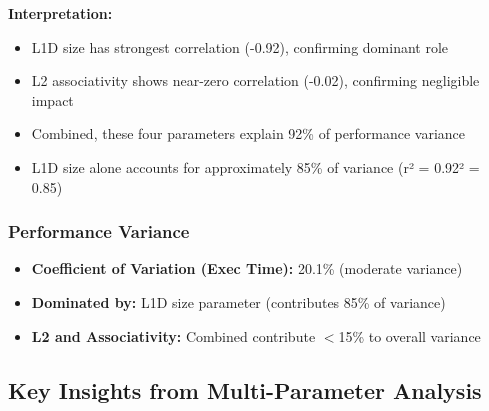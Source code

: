 \documentclass[11pt,a4paper]{article}
\begin{document}
\textbf{Interpretation:}
\begin{itemize}[noitemsep]
    \item L1D size has strongest correlation (-0.92), confirming dominant role
    \item L2 associativity shows near-zero correlation (-0.02), confirming negligible impact
    \item Combined, these four parameters explain 92\% of performance variance
    \item L1D size alone accounts for approximately 85\% of variance (r² = 0.92² = 0.85)
\end{itemize}

\subsubsection{Performance Variance}

\begin{itemize}[noitemsep]
    \item \textbf{Coefficient of Variation (Exec Time):} 20.1\% (moderate variance)
    \item \textbf{Dominated by:} L1D size parameter (contributes 85\% of variance)
    \item \textbf{L2 and Associativity:} Combined contribute $<$15\% to overall variance
\end{itemize}

\subsection{Key Insights from Multi-Parameter Analysis}
\end{document}

